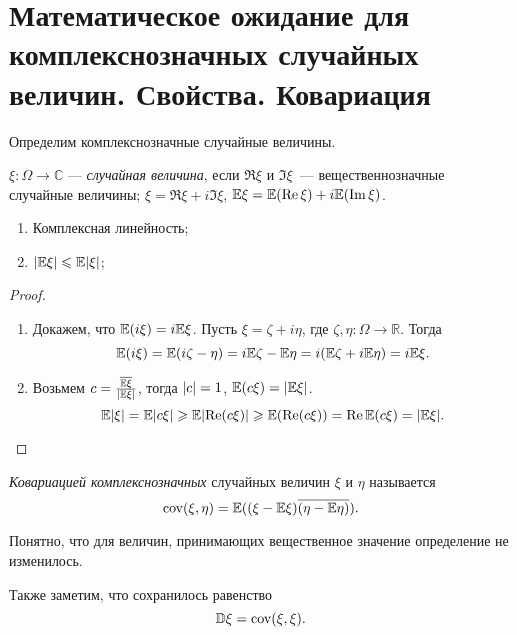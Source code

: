 \section{Математическое ожидание для комплекснозначных случайных величин. Свойства. Ковариация}

Определим комплекснозначные случайные величины.

 \begin{definition}
     $\xi\colon \Omega\rightarrow\mathbb{C}$ --- \textit{случайная величина}, если $\Re\xi$ и $\Im\xi$~--- вещественнозначные случайные величины;
     $\xi = \Re\xi + i\Im\xi$, $\mathbb{E} \xi = \mathbb{E} (\operatorname{Re}\xi) + i\mathbb{E} (\operatorname{Im}\xi)$.
 \end{definition}

 \begin{properties}
\enewline
     \begin{enumerate}
         \item Комплексная линейность;
                

         \item $\lvert\mathbb{E} \xi\rvert \leqslant \mathbb{E} \lvert\xi\rvert$;

               
     \end{enumerate}
 \end{properties}

\begin{proof}
 \enewline
     \begin{enumerate}
         \item Докажем, что $\mathbb{E} (i\xi) = i\mathbb{E} \xi$. Пусть $\xi = \zeta + i\eta$, где $\zeta, \eta\colon \Omega\rightarrow\mathbb{R}$. Тогда
               $$\mathbb{E} (i\xi) = \mathbb{E} (i\zeta - \eta) = i\mathbb{E} \zeta - \mathbb{E} \eta = i(\mathbb{E} \zeta + i\mathbb{E} \eta) = i\mathbb{E} \xi.$$
               \item Возьмем $c=\frac{\overline{\mathbb{E} \xi}}{\lvert\mathbb{E} \xi\rvert}$, тогда $\lvert c\rvert = 1$, $\mathbb{E} (c\xi) = \lvert\mathbb{E} \xi\rvert$.
               $$\mathbb{E} \lvert\xi\rvert = \mathbb{E} \lvert c\xi\rvert \geqslant \mathbb{E} \lvert\operatorname{Re}(c\xi)\rvert \geqslant \mathbb{E} (\operatorname{Re}(c\xi)) = \operatorname{Re} \mathbb{E} (c\xi) = \lvert\mathbb{E} \xi\rvert.$$
               \qedhere
     \end{enumerate}
\end{proof}
 \begin{definition} \textit{Ковариацией комплекснозначных} случайных величин $\xi$ и $\eta$ называется
     $$\text{cov} (\xi, \eta) = \mathbb{E} ((\xi -\mathbb{E} \xi)\overline{(\eta - \mathbb{E} \eta)}).$$
 \end{definition}
 
 Понятно, что для величин, принимающих вещественное значение определение не изменилось.
 
 Также заметим, что сохранилось равенство
 $$\mathbb{D}\xi = \text{cov} (\xi, \xi).$$
